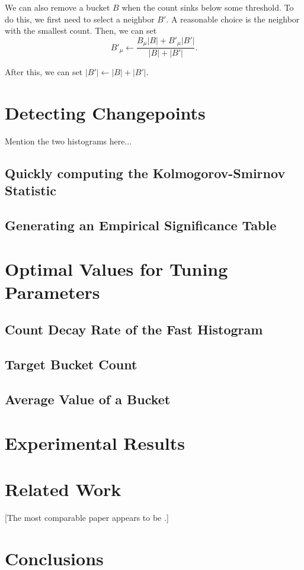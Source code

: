 \documentclass{sigkddExp}
\begin{document}
    We can also remove a bucket $B$ when the count sinks below some threshold.
    To do this, we first need to select a neighbor $B'$. A reasonable choice is
    the neighbor with the smallest count. Then, we can set
    \begin{displaymath}
        B'_{\mu} \leftarrow \frac{B_{\mu} |B| + B'_{\mu} |B'|}{|B| + |B'|}.
    \end{displaymath}

    After this, we can set $|B'| \leftarrow |B| + |B'|$.

\section{Detecting Changepoints}
    Mention the two histograms here...

\subsection{Quickly computing the Kolmogorov-Smirnov Statistic}
\subsection{Generating an Empirical Significance Table}

\section{Optimal Values for Tuning Parameters}
\label{sec:optimalTuningParameters}
\subsection{Count Decay Rate of the Fast Histogram}
\subsection{Target Bucket Count}
\subsection{Average Value of a Bucket}

\section{Experimental Results}

\section{Related Work}
    [The most comparable paper appears to be \cite{kifer2004detecting}.]

\section{Conclusions}



\end{document}
